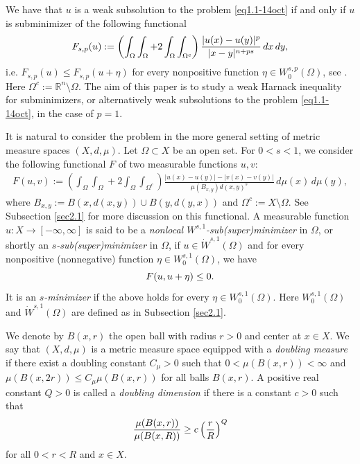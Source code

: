 \documentclass[11pt,leqno]{amsart}
\numberwithin{equation}{section}
\theoremstyle{definition}
\begin{document}
	We have that $u$ is a weak subsolution to  the problem \eqref{eq1.1-14oct} if and only if $u$ is 
	subminimizer of the following functional
	\begin{equation}\label{eq1.2-7dec}\notag
		F_{s,p}(u):= \left( \int_\Omega\int_\Omega +2\int_\Omega\int_{\Omega^c} \right) \frac{|u(x)-u(y)|^{p}}{|x-y|^{n+ps}}\,dx\,dy,
	\end{equation}
	i.e. $F_{s,p}(u)\leq F_{s,p}(u+\eta)$ for every nonpositive function $\eta\in W^{s,p}_0(\Omega)$,
	see \cite[Theorem 2.3]{DKP16}. Here $\Omega^c:=\mathbb R^n\setminus \Omega$.
	The aim of this paper is to study a weak Harnack inequality for subminimizers, or alternatively
	weak subsolutions to the problem \eqref{eq1.1-14oct}, in the case of $p=1$. %

	It is natural to consider the problem in the more general setting of metric measure spaces $(X,d,\mu)$.
	Let $\Omega\subset X$ be an open set.
	For $0<s<1$, we consider the following functional $F$ of two measurable functions $u,v$:
	\begin{align*}
		F(u,v)
		:= \left( \int_\Omega\int_\Omega +2 \int_\Omega\int_{\Omega^c} \right) \frac{|u(x)-u(y)| 
			-|v(x)-v(y)| }{\mu(B_{x,y})d(x,y)^s}\,d\mu(x)\,d\mu(y),
	\end{align*}
	where $B_{x,y}:=B(x,d(x,y))\cup B(y,d(y,x))$ and $\Omega^c:=X\setminus\Omega$.
	See Subsection \ref{sec2.1} for more discussion on this functional.  A measurable
	function $u:X\to[-\infty,\infty]$ is said to be a \emph{nonlocal $W^{s,1}$-sub(super)minimizer}
	{in $\Omega$,}
	or shortly an \emph{$s$-sub(super)minimizer} 
	{in $\Omega$,}
	if
	$u\in \dot W^{s,1}(\Omega)$ and for every nonpositive (nonnegative) function
	$\eta\in W^{s,1}_0(\Omega)$, we have
	\begin{equation}\notag
		F(u,u+\eta)\leq 0.
	\end{equation}
	{It is an \emph{$s$-minimizer} if the above holds for every $\eta\in W^{s,1}_0(\Omega)$.}
	Here $W^{s,1}_0(\Omega)$ and $\dot W^{s,1}(\Omega)$ are defined as in
	Subsection \ref{sec2.1}.
	
	We denote by $B(x,r)$ the open ball with radius $r>0$ and center at $x\in X$.
	We say that $(X,d,\mu)$ is a metric measure space equipped with a \emph{doubling measure}  if there exist a doubling constant $C_\mu>0$ such that
	$
	0<\mu(B(x,r))<\infty 
	$
	and
	$
	\mu(B(x,2r))\leq C_\mu \mu(B(x,r)) 
	$
	for all balls $B(x,r)$. A positive real constant $Q>0$ is called a \emph{doubling dimension} if there is a constant $c>0$ such that
	\begin{equation}\notag
		{\frac{\mu(B(x,r))}{\mu(B(x,R))}\geq 
			c
			\left( \frac{r}{R}\right)^Q}
	\end{equation}
	for all $0<r<R$ and $x\in X$.
	
\end{document}
